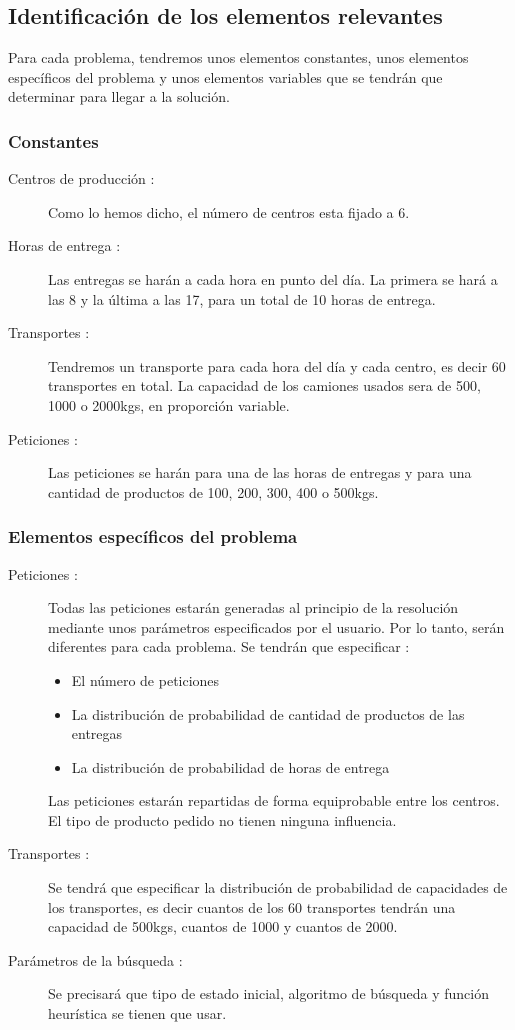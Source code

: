 \documentclass{article}
\begin{document}
\subsection{Identificación de los elementos relevantes}

Para cada problema, tendremos unos elementos constantes, unos elementos
específicos del problema y unos elementos variables que se tendrán que
determinar para llegar a la solución.

\subsubsection{Constantes}

\begin{description}
\item[Centros de producción :] Como lo hemos dicho, el número de centros esta 
fijado a 6.
\item[Horas de entrega :] Las entregas se harán a cada hora en punto del día. La
primera se hará a las 8 y la última a las 17, para un total de 10 horas de
entrega.
\item[Transportes :] Tendremos un transporte para cada hora del día y cada
centro, es decir 60 transportes en total. La capacidad de los camiones usados
sera de 500, 1000 o 2000kgs, en proporción variable.
\item[Peticiones :] Las peticiones se harán para una de las horas de entregas y
para una cantidad de productos de 100, 200, 300, 400 o 500kgs.
\end{description}

\subsubsection{Elementos específicos del problema}

\begin{description}
\item[Peticiones :] Todas las peticiones estarán generadas al principio de la
resolución mediante unos parámetros especificados por el usuario. Por lo tanto,
serán diferentes para cada problema. Se tendrán que especificar :
\begin{itemize}
\item El número de peticiones
\item La distribución de probabilidad de cantidad de productos de las entregas
\item La distribución de probabilidad de horas de entrega
\end{itemize}
Las peticiones estarán repartidas de forma equiprobable entre los centros.
El tipo de producto pedido no tienen ninguna influencia.
\item[Transportes :] Se tendrá que especificar la distribución de probabilidad
de capacidades de los transportes, es decir cuantos de los 60 transportes
tendrán una capacidad de 500kgs, cuantos de 1000 y cuantos de 2000.
\item[Parámetros de la búsqueda :] Se precisará que tipo de estado inicial,
algoritmo de búsqueda y función heurística se tienen que usar. 
\end{description}
\end{document}
